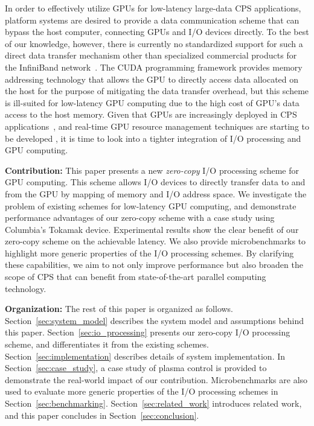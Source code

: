 In order to effectively utilize GPUs for low-latency large-data CPS
applications, platform systems are desired to provide a data
communication scheme that can bypass the host computer, connecting GPUs
and I/O devices directly.
To the best of our knowledge, however, there is currently no
standardized support for such a direct data transfer mechanism other than
specialized commercial products for the InfiniBand
network~\cite{GPUDirect}.
The CUDA programming framework provides memory addressing technology
that allows the GPU to directly access data allocated on the host for
the purpose of mitigating the data transfer overhead, but this scheme is
ill-suited for low-latency GPU computing due to the high cost of GPU's
data access to the host memory.
Given that GPUs are increasingly deployed in
CPS applications~\cite{Hirabayashi_REACTION12, Mangharam11,
McNaughton_ICRA11, Michel_IROS07}, and real-time GPU resource management
techniques are starting to be developed \cite{Elliott_RTS12,
Elliott_ECRTS12, Kato_RTAS11, Kato_RTSS11, Kato_ATC11, Kato_ATC12,
Liu_PACT12}, it is time to look into a tighter integration of I/O
processing and GPU computing.

\textbf{Contribution:}
This paper presents a new \emph{zero-copy} I/O processing scheme for GPU
computing.
This scheme allows I/O devices to directly transfer data to and from the
GPU by mapping of memory and I/O address space.
We investigate the problem of existing schemes for low-latency GPU
computing, and demonstrate performance advantages of our zero-copy
scheme with a case study using Columbia's Tokamak device.
Experimental results show the clear benefit of our zero-copy scheme on
the achievable latency.
We also provide microbenchmarks to highlight more generic
properties of the I/O processing schemes.
By clarifying these capabilities, we aim to not only improve performance
but also broaden the scope of CPS that can benefit from state-of-the-art
parallel computing technology.

\textbf{Organization:}
The rest of this paper is organized as follows.
Section~\ref{sec:system_model} describes the system model and
assumptions behind this paper.
Section~\ref{sec:io_processing} presents our zero-copy I/O processing
scheme, and differentiates it from the existing schemes.
Section~\ref{sec:implementation} describes details of system
implementation.
In Section~\ref{sec:case_study}, a case study of plasma control is
provided to demonstrate the real-world impact of our contribution.
Microbenchmarks are also used to evaluate more generic properties of the
I/O processing schemes in Section~\ref{sec:benchmarking}.
Section~\ref{sec:related_work} introduces related work, and this paper
concludes in Section~\ref{sec:conclusion}.
